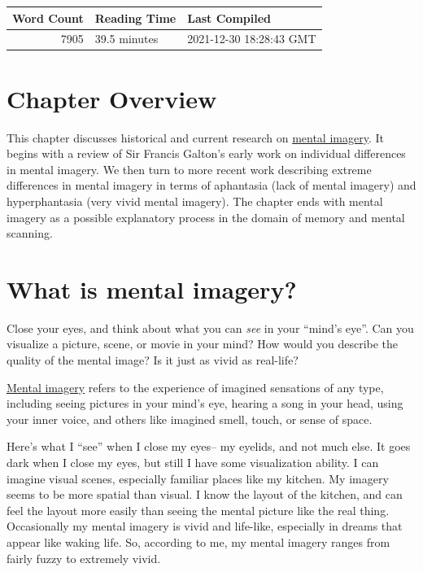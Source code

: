 \documentclass[
  oneside,
  12pt]{crumpbook}
\begin{document}
\begin{tabular}{r|l|l}
\hline
Word Count & Reading Time & Last Compiled\\
\hline
7905 & 39.5 minutes & 2021-12-30 18:28:43 GMT\\
\hline
\end{tabular}

\hypertarget{chapter-overview-1}{%
\section{Chapter Overview}\label{chapter-overview-1}}

This chapter discusses historical and current research on \protect\hyperlink{gls-mentalimagery}{mental imagery}. It begins with a review of Sir Francis Galton's early work on individual differences in mental imagery. We then turn to more recent work describing extreme differences in mental imagery in terms of aphantasia (lack of mental imagery) and hyperphantasia (very vivid mental imagery). The chapter ends with mental imagery as a possible explanatory process in the domain of memory and mental scanning.

\hypertarget{what-is-mental-imagery}{%
\section{What is mental imagery?}\label{what-is-mental-imagery}}

Close your eyes, and think about what you can \emph{see} in your ``mind's eye''. Can you visualize a picture, scene, or movie in your mind? How would you describe the quality of the mental image? Is it just as vivid as real-life?

\protect\hyperlink{gls-mentalimagery}{Mental imagery} refers to the experience of imagined sensations of any type, including seeing pictures in your mind's eye, hearing a song in your head, using your inner voice, and others like imagined smell, touch, or sense of space.

Here's what I ``see'' when I close my eyes-- my eyelids, and not much else. It goes dark when I close my eyes, but still I have some visualization ability. I can imagine visual scenes, especially familiar places like my kitchen. My imagery seems to be more spatial than visual. I know the layout of the kitchen, and can feel the layout more easily than seeing the mental picture like the real thing. Occasionally my mental imagery is vivid and life-like, especially in dreams that appear like waking life. So, according to me, my mental imagery ranges from fairly fuzzy to extremely vivid.
\end{document}

